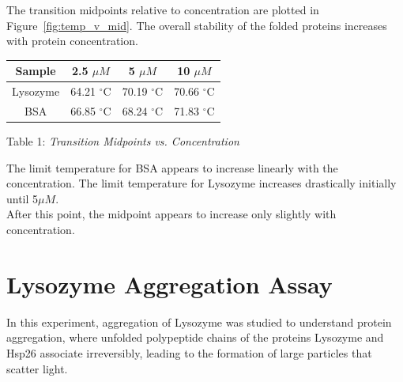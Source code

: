 \documentclass[a4paper,10pt]{article}
\begin{document}
            \begin{minipage}{0.49\textwidth}
                \vspace{-2em}
                The transition midpoints relative to concentration are plotted in Figure~\ref{fig:temp_v_mid}.
                The overall stability of the folded proteins increases with protein concentration.\\

                \begin{tabular}{| c | c | c | c |}
                    \hline
                    Sample & 2.5 $\mu M$ & 5 $\mu M$ & 10 $\mu M$ \\
                    \hline
                    \hline
                    Lysozyme & 64.21 $^{\circ}$C & 70.19 $^{\circ}$C & 70.66 $^{\circ}$C \\
                    BSA & 66.85 $^{\circ}$C & 68.24 $^{\circ}$C & 71.83 $^{\circ}$C \\
                    \hline
                \end{tabular}
                \begin{center}
                    \small Table 1: \it Transition Midpoints vs. Concentration
                    \label{tab:midpoints}
                \end{center}

                The limit temperature for BSA appears to increase linearly with the concentration. 
                The limit temperature for Lysozyme increases drastically initially until 5$\mu M$.\\
                After this point, the midpoint appears to increase only slightly with concentration.
            \end{minipage}
    \pagebreak
    
    \section{Lysozyme Aggregation Assay}
        In this experiment, aggregation of Lysozyme was studied to understand protein aggregation, 
        where unfolded polypeptide chains of the proteins Lysozyme and Hsp26 associate irreversibly, 
        leading to the formation of large particles that scatter light.
        
\end{document}
